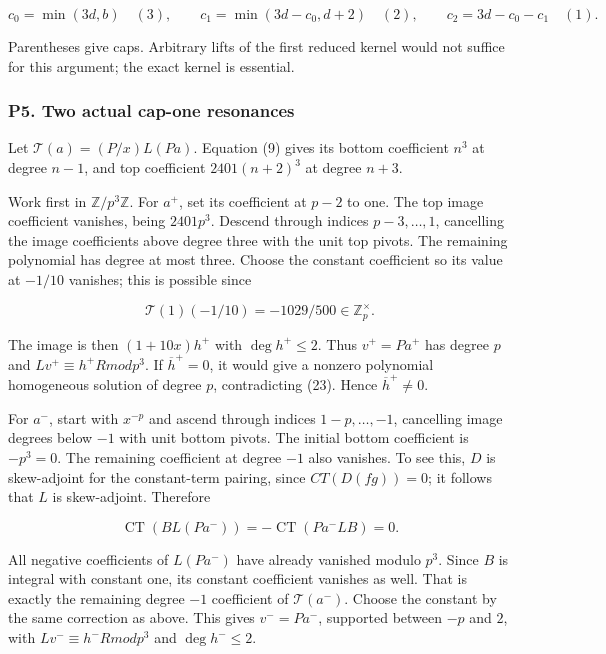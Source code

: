 \documentclass[11pt,a4paper]{article}
\begin{document}
\[
c_0=\min(3d,b)\quad(3),\qquad
c_1=\min(3d-c_0,d+2)\quad(2),\qquad
c_2=3d-c_0-c_1\quad(1).\tag{28}
\]

Parentheses give caps. Arbitrary lifts of the first reduced kernel would not suffice for this argument; the exact kernel is essential.

\hypertarget{p5.-two-actual-cap-one-resonances}{%
\subsubsection{P5. Two actual cap-one resonances}\label{p5.-two-actual-cap-one-resonances}}

Let \(\mathcal{T}(a)=(P/x)L(Pa)\). Equation (9) gives its bottom coefficient \(n^{3}\) at degree \(n-1\), and top coefficient \(2401(n+2)^{3}\) at degree \(n+3\).

Work first in \(\mathbb{Z}/p^{3}\mathbb{Z}\). For \(a^{+}\), set its coefficient at \(p-2\) to one. The top image coefficient vanishes, being \(2401p^{3}\). Descend through indices \(p-3,\ldots ,1\), cancelling the image coefficients above degree three with the unit top pivots. The remaining polynomial has degree at most three. Choose the constant coefficient so its value at \(-1/10\) vanishes; this is possible since

\[
\mathcal T(1)(-1/10)=-1029/500\in\mathbb Z_p^\times.
\]

The image is then \((1+10x)h^{+}\) with \(\operatorname{deg} h^{+}≤2\). Thus \(v^{+}=Pa^{+}\) has degree \(p\) and \(Lv^{+}≡h^{+}R mod p^{3}\). If \(\overline{h}^{+}=0\), it would give a nonzero polynomial homogeneous solution of degree \(p\), contradicting (23). Hence \(\overline{h}^{+}≠0\).

For \(a^{-}\), start with \(x^{-p}\) and ascend through indices \(1-p,\ldots ,-1\), cancelling image degrees below \(-1\) with unit bottom pivots. The initial bottom coefficient is \(-p^{3}=0\). The remaining coefficient at degree \(-1\) also vanishes. To see this, \(D\) is skew-adjoint for the constant-term pairing, since \(CT(D(fg))=0\); it follows that \(L\) is skew-adjoint. Therefore

\[
\operatorname{CT}(BL(Pa^-))=-\operatorname{CT}(Pa^-LB)=0.
\]

All negative coefficients of \(L(Pa^{-})\) have already vanished modulo \(p^{3}\). Since \(B\) is integral with constant one, its constant coefficient vanishes as well. That is exactly the remaining degree \(-1\) coefficient of \(\mathcal{T}(a^{-})\). Choose the constant by the same correction as above. This gives \(v^{-}=Pa^{-}\), supported between \(-p\) and \(2\), with \(Lv^{-}≡h^{-}R mod p^{3}\) and \(\operatorname{deg} h^{-}≤2\).
\end{document}
